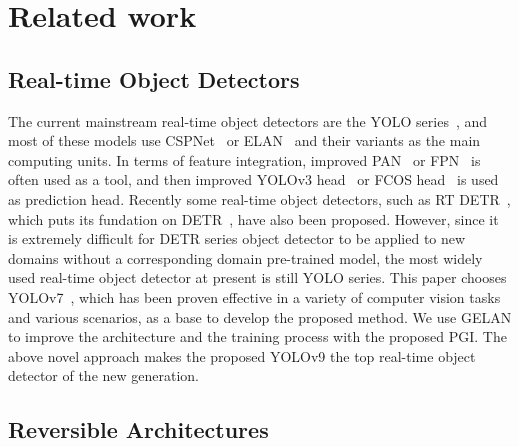 \documentclass[10pt,twocolumn,letterpaper]{article}
\begin{document}
	\section{Related work}
	\label{sec:relw}
	
	\subsection{Real-time Object Detectors}
	
	\vspace{-2pt}
	
	The current mainstream real-time object detectors are the YOLO series~\cite{redmon2016you,redmon2017yolo9000,redmon2018yolov3,bochkovskiy2020yolov4,wang2021scaled,ge2021yolox,xu2022pp,li2022yolov6,xu2022damo,glenn2022yolov5,li2023yolov6,huang2023yolocs,wang2023yolov7,chen2023yolo,wang2023gold,glenn2024yolov8}, and most of these models use CSPNet~\cite{wang2020cspnet} or ELAN~\cite{wang2023designing} and their variants as the main computing units.  In terms of feature integration, improved PAN~\cite{liu2018path} or FPN~\cite{lin2017feature} is often used as a tool, and then improved YOLOv3 head~\cite{redmon2018yolov3} or FCOS head~\cite{tian2019fcos,tian2022fcos} is used as prediction head.  Recently some real-time object detectors, such as RT DETR~\cite{lv2023detrs}, which puts its fundation on DETR~\cite{carion2020end}, have also been proposed.  However, since it is extremely difficult for DETR series object detector to be applied to new domains without a corresponding domain pre-trained model, the most widely used real-time object detector at present is still YOLO series.  This paper chooses YOLOv7~\cite{wang2023yolov7}, which has been proven effective in a variety of computer vision tasks and various scenarios, as a base to develop the proposed method.  We use GELAN to improve the architecture and the training process with the proposed PGI.  The above novel approach makes the proposed YOLOv9 the top real-time object detector of the new generation.
	
	\vspace{-2pt}
	
	\subsection{Reversible Architectures}
	
	\vspace{-2pt}
	
\end{document}
